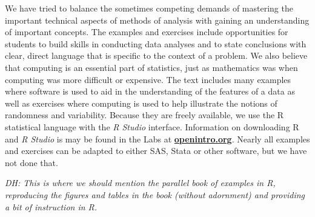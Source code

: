 \begin{doublespace}
We have tried to balance the sometimes competing demands of mastering the important technical aspects of methods of analysis with gaining an understanding of important concepts.  The examples and exercises include opportunities for students to build skills in conducting data analyses and to state conclusions with clear, direct language that is specific to the context of a problem.  We also believe that computing is an essential part of statistics, just as mathematics was when computing was more difficult or expensive.  The text includes many examples where software is used to aid in the understanding of the features of a data as well as exercises where computing is used to help illustrate the notions of randomness and variability. Because they are freely available, we use the \textsf{R} statistical language with the \textsl{R Studio} interface.  Information on downloading \textsf{R} and \textsl{R Studio} is may be found in the Labs at \href{http://www.openintro.org}{\color{black}\textbf{openintro.org}}.  Nearly all examples and exercises can be adapted to either SAS, Stata or other software, but we have not done that.

\textit{DH: This is where we should mention the parallel book of examples in R, reproducing the figures and tables in the book (without adornment) and providing a bit of instruction in R.}



\begin{comment}

This book may be downloaded as a free PDF at \href{http://www.openintro.org}{\color{black}\textbf{openintro.org}}. %
\vspace{3mm}

\noindent We hope readers will take away three ideas from this book in addition to forming a foundation of statistical thinking and methods.\vspace{-1mm}
\begin{enumerate}
\setlength{\itemsep}{0mm}
\item[(1)] Statistics is an applied field with a wide range of practical applications.
\item[(2)] You don't have to be a math guru to learn from real, interesting data.
\item[(3)] Data is messy, and statistical tools are imperfect. But, when you understand the strengths and weaknesses of these tools, you can use them to learn about the real~world.
\end{enumerate}


\end{comment}
\end{doublespace}
